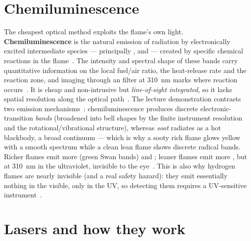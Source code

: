 \section{Chemiluminescence}

The cheapest optical method exploits the flame's own light. \textbf{Chemiluminescence} is the natural emission of radiation by electronically excited intermediate species --- principally ,  and  --- created by specific chemical reactions in the flame~\cite{lecture6}. The intensity and spectral shape of these bands carry quantitative information on the local fuel/air ratio, the heat-release rate and the reaction zone, and imaging through an  filter at \SI{310}{nm} marks where reaction occurs~\cite{lecture6}. It is cheap and non-intrusive but \emph{line-of-sight integrated}, so it lacks spatial resolution along the optical path~\cite{lecture6}. The lecture demonstration contrasts two emission mechanisms~\cite{transcript_l7}: chemiluminescence produces discrete electronic-transition \emph{bands} (broadened into bell shapes by the finite instrument resolution and the rotational/vibrational structure), whereas \emph{soot} radiates as a hot blackbody, a broad continuum --- which is why a sooty rich flame glows yellow with a smooth spectrum while a clean lean flame shows discrete radical bands. Richer flames emit more  (green Swan bands) and ; leaner flames emit more , but at \SI{310}{nm} in the ultraviolet, invisible to the eye~\cite{transcript_l7,vera2014c2swan}. This is also why hydrogen flames are nearly invisible (and a real safety hazard): they emit essentially nothing in the visible, only  in the UV, so detecting them requires a UV-sensitive instrument~\cite{transcript_l7,schefer2009visible_hydrogen}.

\section{Lasers and how they work}

